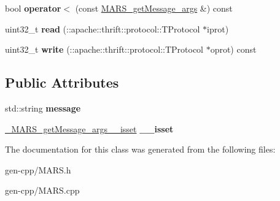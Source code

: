 \begin{DoxyCompactItemize}
bool {\bfseries operator$<$} (const \hyperlink{classMARS_1_1MARS__getMessage__args}{M\+A\+R\+S\+\_\+get\+Message\+\_\+args} \&) const
\item 
\mbox{\label{classMARS_1_1MARS__getMessage__args_af65cb8e7c539f59589aa0034727ed7f2}} 
uint32\+\_\+t {\bfseries read} (\+::apache\+::thrift\+::protocol\+::\+T\+Protocol $\ast$iprot)
\item 
\mbox{\label{classMARS_1_1MARS__getMessage__args_a30962f2a62afa2b64b644654a964cb69}} 
uint32\+\_\+t {\bfseries write} (\+::apache\+::thrift\+::protocol\+::\+T\+Protocol $\ast$oprot) const
\end{DoxyCompactItemize}
\subsection*{Public Attributes}
\begin{DoxyCompactItemize}
\item 
\mbox{\label{classMARS_1_1MARS__getMessage__args_a7dc8c0eaddecd6c6b9622c1af318df37}} 
std\+::string {\bfseries message}
\item 
\mbox{\label{classMARS_1_1MARS__getMessage__args_a8350ca66491bbe826b385c8af38701db}} 
\hyperlink{structMARS_1_1__MARS__getMessage__args____isset}{\+\_\+\+M\+A\+R\+S\+\_\+get\+Message\+\_\+args\+\_\+\+\_\+isset} {\bfseries \+\_\+\+\_\+isset}
\end{DoxyCompactItemize}


The documentation for this class was generated from the following files\+:\begin{DoxyCompactItemize}
\item 
gen-\/cpp/M\+A\+R\+S.\+h\item 
gen-\/cpp/M\+A\+R\+S.\+cpp\end{DoxyCompactItemize}
